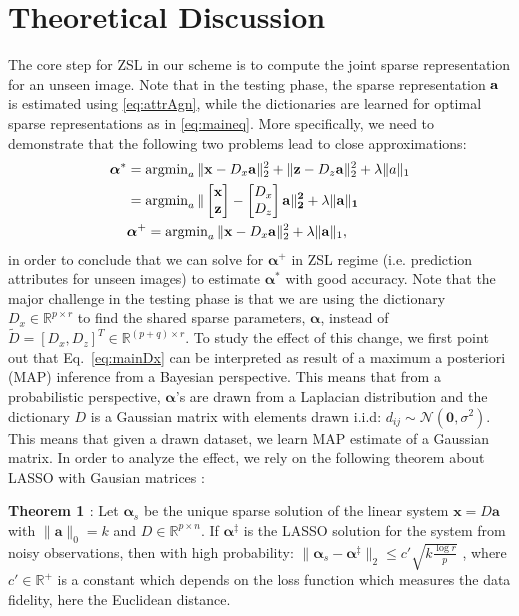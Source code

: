 \documentclass[letterpaper]{article} %
\def\x{\mathbf{x}}
\def\a{\mathbf{a}}
\def\z{\mathbf{z}}
\def\R{\mathbb{R}}
\def\balpha{\boldsymbol{\alpha}}
\begin{document}
\section{Theoretical Discussion}
\label{sec:analysis}
The core step for ZSL in our scheme is to compute the joint sparse representation for an unseen image. Note that in the testing phase, the sparse representation $\bf{a}$ is estimated using \eqref{eq:attrAgn}, while the dictionaries are learned for optimal sparse representations as in \eqref{eq:maineq}.   More specifically, we need to demonstrate that  the following two problems lead to close approximations:
\begin{equation}
\begin{split}
\balpha^*&=\operatorname{argmin}_a \|\x-D_x\a\|_2^2 +\|\z-D_z\a\|_2^2+\lambda\|a\|_1\\&= \operatorname{argmin}_a \|\begin{bmatrix}
    \x           \\
    \z           
\end{bmatrix}-\begin{bmatrix}
    D_x           \\
    D_z         
\end{bmatrix}\bf{a}\|_2^2  +\lambda\|\bf{a}\|_1\\
&\balpha^+=\operatorname{argmin}_a \|\x-D_x\a\|_2^2 +\lambda\|\a\|_1,   
\end{split}
\label{eq:dic}
\end{equation}  
in order to conclude that we can solve  for $\balpha^+$ in ZSL regime (i.e. prediction attributes for unseen images) to estimate $\balpha^*$ with good accuracy. Note that the major challenge in the testing phase is that we are using the dictionary $D_x\in\mathbb{R}^{p\times r}$ to find the shared sparse parameters, $\balpha$, instead of $\tilde{D}=[D_x,D_z]^T\in\mathbb{R}^{(p+q)\times r}$. To study the effect of this change, we first point out that  Eq.~\ref{eq:mainDx} can  be interpreted as result of  a maximum a posteriori (MAP) inference from a Bayesian perspective. This means that from a probabilistic perspective, $\balpha$'s are drawn from a Laplacian distribution  and the dictionary $D$ is  a  Gaussian matrix with elements drawn i.i.d: $d_{ij} \sim  \mathcal{N}(\bm{0}, \sigma^2)$. This means that given a drawn dataset, we learn MAP estimate of a Gaussian matrix. In order to analyze the effect, we rely on the following theorem about LASSO with Gausian matrices \cite{negahban2009unified}:

\textbf{Theorem 1 \cite{negahban2009unified}}:
Let $\balpha_s$ be the unique sparse solution of the linear system $\x=D\a$ with $\|\a\|_0=k$ and $D \in \R^{p\times n}$. If $\balpha^\ddagger$ is the LASSO solution
for the system from noisy observations, then with high probability: \mbox{$\|\balpha_s-\balpha^\ddagger\|_2 \leq c'\sqrt{k\frac{\log r}{p}}$}  \enspace, 
where  $c'\in\mathbb{R}^+$ is a constant which depends on the loss function which measures the data fidelity, here the Euclidean distance.
\end{document}

